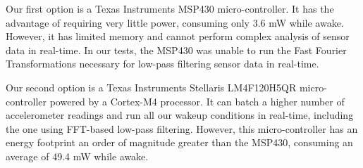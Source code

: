 Our first option is a Texas Instruments MSP430 micro-controller. It has the advantage of requiring very little power, consuming only 3.6 mW while awake. However, it has limited memory and cannot perform complex analysis of sensor data in real-time. In our tests, the MSP430 was unable to run the Fast Fourier Transformations necessary for low-pass filtering sensor data in real-time. 

Our second option is a Texas Instruments Stellaris LM4F120H5QR micro-controller powered by a Cortex-M4 processor. It can batch a higher number of accelerometer readings and run all our wakeup conditions in real-time, including the one using FFT-based low-pass filtering. However, this micro-controller has an energy footprint an order of magnitude greater than the MSP430, consuming an average of 49.4 mW while awake.


